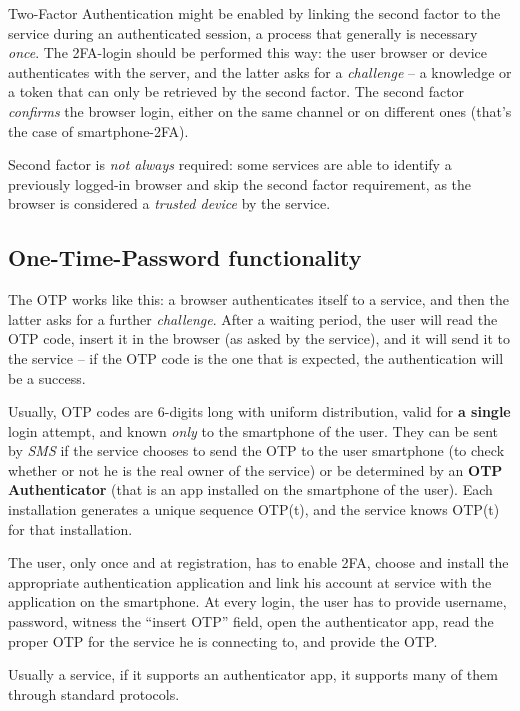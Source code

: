 \documentclass[10pt]{extbook}
\begin{document}
Two\--Factor Authentication might be enabled by linking the second factor to
the service during an authenticated session, a process that generally is
necessary \emph{once}. The 2FA\--login should be performed this way: the user
browser or device authenticates with the server, and the latter asks for a
\emph{challenge} -- a knowledge or a token that can only be retrieved by the
second factor. The second factor \emph{confirms} the browser login, either on
the same channel or on different ones (that's the case of smartphone\--2FA).

Second factor is \emph{not always} required: some services are able to identify
a previously logged\--in browser and skip the second factor requirement, as the
browser is considered a \emph{trusted device} by the service.

\subsection{One\--Time\--Password functionality}

The OTP works like this: a browser authenticates itself to a service, and then
the latter asks for a further \emph{challenge}. After a waiting period, the
user will read the OTP code, insert it in the browser (as asked by the
service), and it will send it to the service -- if the OTP code is the one that
is expected, the authentication will be a success.

Usually, OTP codes are 6\--digits long with uniform distribution, valid for
\textbf{a single} login attempt, and known \emph{only} to the smartphone of the
user. They can be sent by \emph{SMS} if the service chooses to send the OTP to
the user smartphone (to check whether or not he is the real owner of the
service) or be determined by an \textbf{OTP Authenticator} (that is an app
installed on the smartphone of the user). Each installation generates a unique
sequence OTP(t), and the service knows OTP(t) for that installation.

The user, only once and at registration, has to enable 2FA, choose and install
the appropriate authentication application and link his account at service with
the application on the smartphone. At every login, the user has to provide
username, password, witness the ``insert OTP'' field, open the authenticator
app, read the proper OTP for the service he is connecting to, and provide the
OTP.

Usually a service, if it supports an authenticator app, it supports many of
them through standard protocols. 
\end{document}
